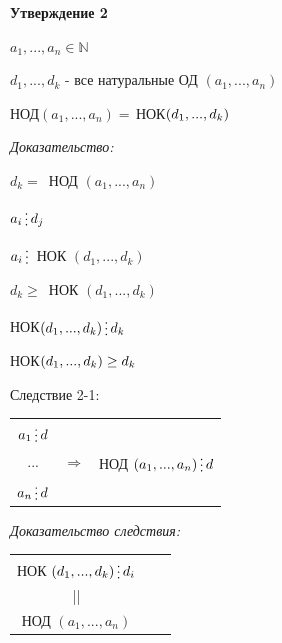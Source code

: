 \documentclass[12pt]{article}
\begin{document}
\textbf{Утверждение 2}\par
$a_1,...,a_n \in \mathbb{N}$\par
$d_1,...,d_k$ - все натуральные ОД $(a_1,...,a_n)$\par
НОД$(a_1,...,a_n)=\,$НОК$(d_1,...,d_k) \newline$\par
\it{Доказательство:}\par
$d_k =\,$ НОД $(a_1,...,a_n)$\par
$a_i \mathop{\raisebox{-2pt}{\vdots}} d_j$\par
$a_i \mathop{\raisebox{-2pt}{\vdots}} \,$ НОК $(d_1,...,d_k)$\par
$d_k \geq \,$ НОК $(d_1,...,d_k)$\par
НОК$(d_1,...,d_k)\mathop{\raisebox{-2pt}{\vdots}} d_k$\par
НОК$(d_1,...,d_k) \geq d_k \newline$\par
Следствие 2-1:\par
\begin{tabular}{ccc}
    $a_1 \mathop{\raisebox{-2pt}{\vdots}} d$                                     \\
    ... & $\Rightarrow$ & НОД $(a_1,...,a_n) \mathop{\raisebox{-2pt}{\vdots}} d$ \\
    $a_n \mathop{\raisebox{-2pt}{\vdots}} d$                                     \\
\end{tabular}\par
\it{Доказательство следствия:}\par
\begin{tabular}{ccc}
    НОК $(d_1,...,d_k) \mathop{\raisebox{-2pt}{\vdots}} d_i$ \\
    ||                                                       \\
    НОД $(a_1,...,a_n)$                                      \\
\end{tabular}\par
\end{document}

